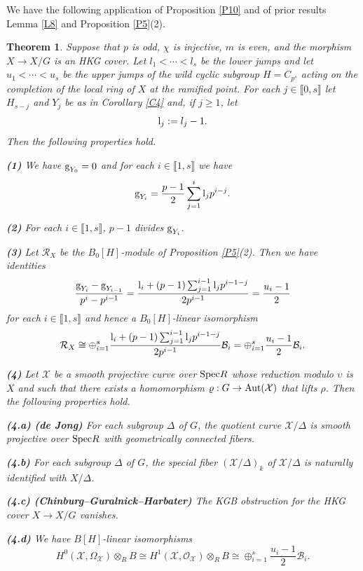 \documentclass[11pt]{amsart}
\newtheorem{theorem}{Theorem}[section]
\def\Aut{\textup{Aut}}
\def\l{\textup{l}}
\def\Spec{\textup{Spec}}
\begin{document}
\smallskip
We have the following application of Proposition \ref{P10} and of prior results Lemma \ref{L8} and Proposition \ref{P5}(2).

\begin{theorem}\label{C6}
Suppose that $p$ is odd, $\chi$ is injective, $m$ is even, and the morphism $X\rightarrow X/G$ is an HKG cover. Let $l_1<\cdots<l_s$ be the lower jumps and let $u_1<\cdots<u_s$ be the upper jumps of the wild cyclic subgroup $H=C_{p^s}$ acting on the completion of the local ring of $X$ at the ramified point. For each $j\in\llbracket0,s\rrbracket$ let $H_{s-j}$ and $Y_j$ be as in Corollary \ref{C4} and, if $j\ge 1$, let 
$$\l_j:=l_j-1.$$ Then the following properties hold. 

\medskip
{\bf (1)} We have $\textup{g}_{Y_0}=0$ and for each $i\in\llbracket1,s\rrbracket$ we have
\[
\textup{g}_{Y_i}=\frac{p-1}{2}\sum_{j=1}^i \l_jp^{i-j}.
\]

{\bf (2)} For each $i\in\llbracket1,s\rrbracket$, $p-1$ divides $\textup{g}_{Y_i}$.

\smallskip
{\bf (3)} Let $\mathcal R_X$ be the $B_0[H]$-module of Proposition \ref{P5}(2). Then we have identities 
$$\frac{\textup{g}_{Y_i}-\textup{g}_{Y_{i-1}}}{p^i-p^{i-1}}=\frac{\l_i+(p-1)\sum_{j=1}^{i-1}\l_jp^{i-1-j}}{2p^{i-1}}=\frac{u_i-1}{2}$$
for each $i\in\llbracket1,s\rrbracket$ and hence a $B_0[H]$-linear isomorphism 
$$\mathcal R_X\cong\oplus_{i=1}^s \frac{\l_i+(p-1)\sum_{j=1}^{i-1}\l_jp^{i-1-j}}{2p^{i-1}}\mathcal B_i= \oplus_{i=1}^s \frac{u_i-1}{2}\mathcal B_i.$$

{\bf (4)} Let $\mathcal X$ be a smooth projective curve over $\Spec R$ whose reduction modulo $\upsilon$ is $X$ and such that there exists a homomorphism $\varrho:G\rightarrow\Aut(\mathcal X)$ that lifts $\rho$. Then the following properties hold.

\medskip\noindent
{\bf (4.a) (de Jong)} For each subgroup $\Delta$ of $G$, the quotient curve $\mathcal X/\Delta$ is smooth projective over $\Spec R$ with geometrically connected fibers.

\smallskip\noindent
{\bf (4.b)} For each subgroup $\Delta$ of $G$, the special fiber $(\mathcal X/\Delta)_k$ of $\mathcal X/\Delta$ is naturally identified with $X/\Delta$.

\smallskip\noindent
{\bf (4.c) (Chinburg--Guralnick--Harbater)} The KGB obstruction for the HKG cover $X\rightarrow X/G$ vanishes.

\smallskip\noindent
{\bf (4.d)} We have $B[H]$-linear isomorphisms
$$H^0(\mathcal X,\Omega_{\mathcal X})\otimes_R B\cong H^1(\mathcal X,\mathcal O_{\mathcal X})\otimes_R B\cong\oplus_{i=1}^s \frac{u_i-1}{2}\mathcal B_i.$$
\end{theorem}
\end{document}
